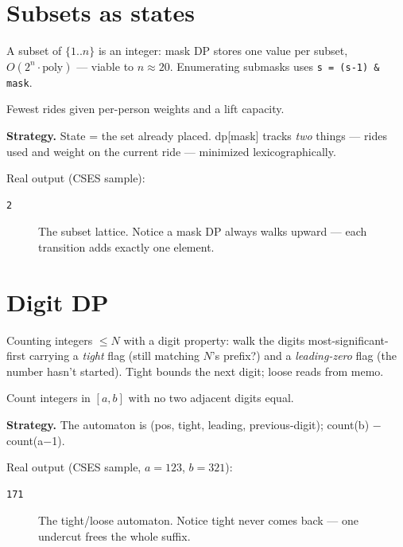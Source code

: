 \section{Subsets as states}\label{sec:masks}
A subset of $\{1..n\}$ is an integer: mask DP stores one value per
subset, $O(2^n \cdot \text{poly})$ --- viable to $n \approx 20$.
Enumerating submasks uses \texttt{s = (s-1) \& mask}.
\begin{example}\label{ex:elev}
Fewest rides given per-person weights and a lift capacity.
\par\smallskip
\textbf{Strategy.} State = the set already placed. dp[mask] tracks
\emph{two} things --- rides used and weight on the current ride ---
minimized lexicographically.
\par\smallskip
\begin{solution}

Real output (CSES sample):
\begin{lstlisting}[numbers=none]
2
\end{lstlisting}
\end{solution}
\end{example}
\begin{figure}[ht]\centering

\caption{The subset lattice. Notice a mask DP always walks
upward --- each transition adds exactly one element.}
\label{fig:mask}
\end{figure}

\section{Digit DP}\label{sec:digit}
Counting integers $\le N$ with a digit property: walk the digits
most-significant-first carrying a \emph{tight} flag (still matching
$N$'s prefix?) and a \emph{leading-zero} flag (the number hasn't
started). Tight bounds the next digit; loose reads from memo.
\begin{example}\label{ex:num}
Count integers in $[a,b]$ with no two adjacent digits equal.
\par\smallskip
\textbf{Strategy.} The automaton is (pos, tight, leading,
previous-digit); count(b) $-$ count(a$-$1).
\par\smallskip
\begin{solution}

Real output (CSES sample, $a{=}123$, $b{=}321$):
\begin{lstlisting}[numbers=none]
171
\end{lstlisting}
\end{solution}
\end{example}
\begin{figure}[ht]\centering

\caption{The tight/loose automaton. Notice tight never comes back ---
one undercut frees the whole suffix.}
\label{fig:digitauto}
\end{figure}


